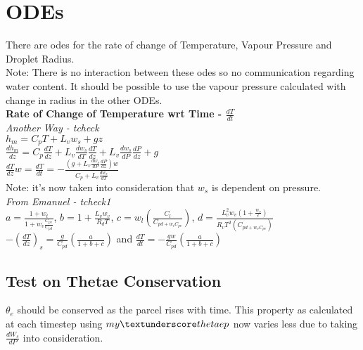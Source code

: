 \documentclass[11pt]{article} %
\begin{document}
\section{ODEs} 

There are odes for the rate of change of Temperature, Vapour Pressure and Droplet Radius.\\

Note: There is no interaction between these odes so no communication regarding water content.  It should be possible to use the vapour pressure calculated with change in radius in the other ODEs.\\

{\bf Rate of Change of Temperature wrt Time - $\frac{dT}{dt}$}\\


\emph{Another Way - tcheck} \\

$h_{m} = C_{p}T + L_{v}w_{s} + gz$\\

$ \frac{dh_{m}}{dz} = C_{p} \frac{dT}{dz} + L_{v} \frac{dw_{s}}{dT} \frac{dT}{dz} + L_{v}\frac{dw_{s}}{dP} \frac{dP}{dz} + g $ \\

$ \frac{dT}{dz} w = \frac{dT}{dt} = - \frac{(g + L_{v}\frac{dw_{s}}{dP} \frac{dP}{dz})w}{C_{p} + L_{v} \frac{dw_{s}}{dT}} $\\

Note: it's now taken into consideration that $w_{s}$ is dependent on pressure.\\

\emph{From Emanuel - tcheck1} \\

$a = \frac{1 + w_{t}}{1 + w_{v}\frac{C_{pv}}{C_{pd}}}$, $b = 1 + \frac{L_{v}w_{v}}{R_{d}T}$, $c = w_{l}(\frac{C_{l}}{C_{pd + w_{v}C_{pv}}})$, $d = \frac{L_{v}^{2}w_{v}(1+\frac{w_{v}}{\epsilon})}{R_{v}T^{2}(C_{pd + w_{v}C_{pv}})}$\\

$-(\frac{dT}{dz})_{s} = \frac{g}{C_{pd}}(\frac{a}{1 + b + c})$ and $\frac{dT}{dt} = -\frac{gw}{C_{pd}}(\frac{a}{1 + b + c})$\\

\subsection{Test on Thetae Conservation}

$\theta_{e}$ should be conserved as the parcel rises with time. This property as calculated at each timestep using $my \textunderscore thetaep$ 
now varies less due to taking $\frac{dW_{s}}{dP}$ into consideration.\\
\end{document}

